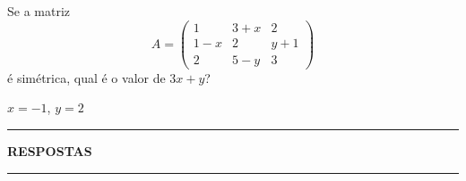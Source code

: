 \documentclass[12pt]{exam}
\begin{document}
\begin{exercicio}
    Se a matriz
        \[
            A = \begin{pmatrix}1 & 3 + x & 2\\1 - x & 2 & y + 1\\2 & 5 - y & 3\end{pmatrix}
        \]
    é simétrica, qual é o valor de $3x + y$?
    \begin{solucao}
        $x = -1$, $y = 2$
    \end{solucao}
\end{exercicio}

\newpage
{}
\hrule
\begin{center}
{\large\bf RESPOSTAS}
\end{center}
\hrule

\end{document}
